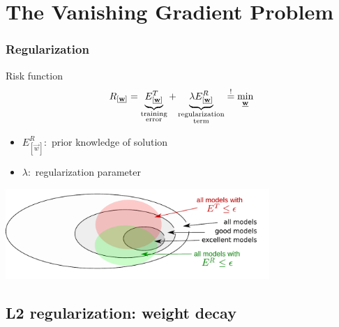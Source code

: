 \section{The Vanishing Gradient Problem}


\begin{frame}\frametitle{Regularization}
	\begin{block}{Risk function}
		\begin{equation*}
			R_{[\underline{\mathbf{w}}]} = \underbrace{ E_{[\underline{\mathbf{w}}]}^T }_{
					\substack{\text{training} \\ \text{error}}}
				+ \underbrace{ \lambda E_{[\underline{\mathbf{w}}]}^R }_{
					\substack{\text{regularization} \\ \text{term}}}
				\stackrel{\mathrm{!}}{=} \min_{\underline{\mathbf{w}}}
		\end{equation*}
		\begin{itemize}
			\item $E^R_{[\vec w]}:$ prior knowledge of solution
			\item $\lambda:$ regularization parameter 
		\end{itemize}
	\end{block}
	
	\begin{center}
		\includegraphics[width=10cm]{img/ModelSelection_models_v2.pdf}
	\end{center}
\end{frame}

\subsection{L2 regularization: weight decay}

